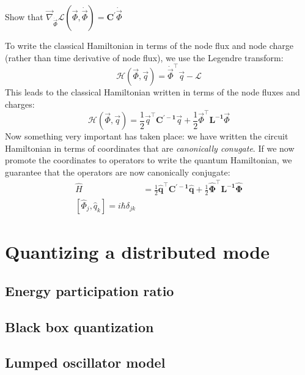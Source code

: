 \begin{exercise}
    Show that $\vec{\nabla}_{\dot{\vec{\Phi}}}\mathcal{L}(\vec\Phi,\dot{\vec{\Phi}}) = \mathbf{C^\prime}\dot{\vec{\Phi}}$
\end{exercise}

To write the classical Hamiltonian in terms of the node flux and node charge (rather than time derivative of node flux), we use the Legendre transform:
\begin{equation}
    \mathcal{H}(\vec\Phi,\vec{q})= \dot{\vec{\Phi}}^\top \vec{q}-\mathcal{L}
\end{equation}
This leads to the classical Hamiltonian written in terms of the node fluxes and charges:
\begin{equation}
    \mathcal{H}(\vec\Phi,\vec{q}) = \frac{1}{2}\vec{q}^\top\mathbf{C^{\prime-1}}\vec{q} + \frac{1}{2}\vec{\Phi}^\top\mathbf{L^{-1}}\vec{\Phi}
\end{equation}
Now something very important has taken place: we have written the circuit Hamiltonian in terms of coordinates that are \textit{canonically conugate}. If we now promote the coordinates to operators to write the quantum Hamiltonian, we guarantee that the operators are now canonically conjugate:
\begin{align}
\hat{H} &= \frac{1}{2}\mathbf{\hat{q}}^\top\mathbf{C^{\prime-1}}\mathbf{\hat{q}} + \frac{1}{2}\mathbf{\hat{\Phi}}^\top\mathbf{L^{-1}}\mathbf{\hat{\Phi}} \\
\left[\hat{\Phi}_j,\hat{q}_k\right] = i\hbar\delta_{jk}
\end{align}

\subsection{}

\section{Quantizing a distributed mode}
\label{sec:distributedQuant}
\subsection{Energy participation ratio}
\subsection{Black box quantization}
\subsection{Lumped oscillator model}
\subsection{}
